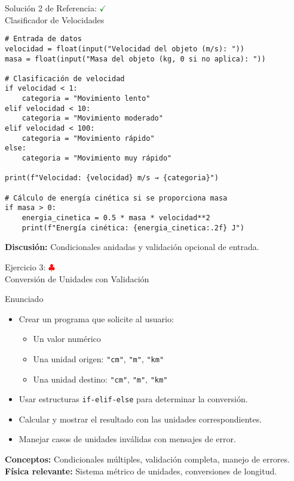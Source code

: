 \documentclass[10pt]{beamer}
\begin{document}
\begin{frame}[fragile]{Solución 2 de Referencia: \hfill \textcolor{green}{$\checkmark$} \\ Clasificador de Velocidades}
\begin{verbatim}
# Entrada de datos
velocidad = float(input("Velocidad del objeto (m/s): "))
masa = float(input("Masa del objeto (kg, 0 si no aplica): "))

# Clasificación de velocidad
if velocidad < 1:
    categoria = "Movimiento lento"
elif velocidad < 10:
    categoria = "Movimiento moderado"
elif velocidad < 100:
    categoria = "Movimiento rápido"
else:
    categoria = "Movimiento muy rápido"

print(f"Velocidad: {velocidad} m/s → {categoria}")

# Cálculo de energía cinética si se proporciona masa
if masa > 0:
    energia_cinetica = 0.5 * masa * velocidad**2
    print(f"Energía cinética: {energia_cinetica:.2f} J")
\end{verbatim}
\textbf{Discusión:} Condicionales anidadas y validación opcional de entrada.
\end{frame}

\begin{frame}{Ejercicio 3: \hfill \textcolor{red}{$\clubsuit$} \\ Conversión de Unidades con Validación}
  \begin{block}{Enunciado}
    \begin{itemize}
      \item Crear un programa que solicite al usuario:
        \begin{itemize}
          \item Un valor numérico
          \item Una unidad origen: \texttt{"cm"}, \texttt{"m"}, \texttt{"km"}
          \item Una unidad destino: \texttt{"cm"}, \texttt{"m"}, \texttt{"km"}
        \end{itemize}
      \item Usar estructuras \texttt{if-elif-else} para determinar la conversión.
      \item Calcular y mostrar el resultado con las unidades correspondientes.
      \item Manejar casos de unidades inválidas con mensajes de error.
    \end{itemize}
  \end{block}
  
  \textbf{Conceptos:} Condicionales múltiples, validación completa, manejo de errores.
  \\
  \textbf{Física relevante:} Sistema métrico de unidades, conversiones de longitud.
\end{frame}
\end{document}
